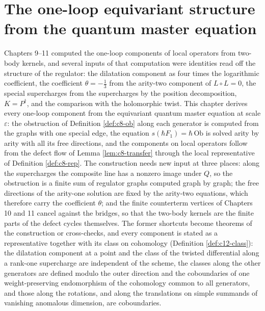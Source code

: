 \chapter{The one-loop equivariant structure from the quantum master equation}

Chapters 9--11 computed the one-loop components of local operators from two-body kernels, and several inputs of that computation were identities read off the structure of the regulator: the dilatation component as four times the logarithmic coefficient, the coefficient $\theta=-\tfrac13$ from the arity-two component of $L\circ L=0$, the special supercharges from the supercharges by the position decomposition, $K=P^\dagger$, and the comparison with the holomorphic twist. This chapter derives every one-loop component from the equivariant quantum master equation at scale $\varepsilon$: the obstruction of Definition \ref{def:c8-ob} along each generator is computed from the graphs with one special edge, the equation $s(\hbar F_1)=\hbar\,\mathrm{Ob}$ is solved arity by arity with all its free directions, and the components on local operators follow from the defect flow of Lemma \ref{lem:c8-transfer} through the local representative of Definition \ref{def:c8-rep}. The construction needs new input at three places: along the supercharges the composite line has a nonzero image under $Q$, so the obstruction is a finite sum of regulator graphs computed graph by graph; the free directions of the arity-one solution are fixed by the arity-two equations, which therefore carry the coefficient $\theta$; and the finite counterterm vertices of Chapters 10 and 11 cancel against the bridges, so that the two-body kernels are the finite parts of the defect cycles themselves. The former shortcuts become theorems of the construction or cross-checks, and every component is stated as a representative together with its class on cohomology (Definition \ref{def:c12-class}): the dilatation component at a point and the class of the twisted differential along a rank-one supercharge are independent of the scheme, the classes along the other generators are defined modulo the outer direction and the coboundaries of one weight-preserving endomorphism of the cohomology common to all generators, and those along the rotations, and along the translations on simple summands of vanishing anomalous dimension, are coboundaries.

